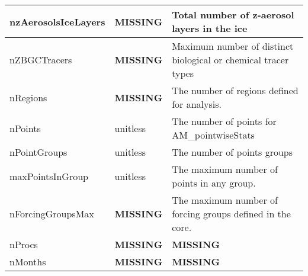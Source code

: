 {\begin{center}
\begin{longtable}{| p{1.0in} || p{1.0in} | p{4.0in} |}
    \hline
    nzAerosolsIceLayers & {\bf \color{red} MISSING} & Total number of z-aerosol layers in the ice \\ 
    \hline
    nZBGCTracers & {\bf \color{red} MISSING} & Maximum number of distinct biological or chemical tracer types \\ 
    \hline
    nRegions & {\bf \color{red} MISSING} & The number of regions defined for analysis. \\ 
    \hline
    nPoints & \si{unitless} & The number of points for AM\_pointwiseStats \\ 
    \hline
    nPointGroups & \si{unitless} & The number of points groups \\ 
    \hline
    maxPointsInGroup & \si{unitless} & The maximum number of points in any group. \\ 
    \hline
    nForcingGroupsMax & {\bf \color{red} MISSING} & The maximum number of forcing groups defined in the core. \\ 
    \hline
    nProcs & {\bf \color{red} MISSING} & {\bf \color{red} MISSING} \\ 
    \hline
    nMonths & {\bf \color{red} MISSING} & {\bf \color{red} MISSING} \\ 
    \hline
\end{longtable}
\end{center}
}
